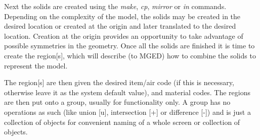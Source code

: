 Next the solids are created using the
{\em make}, {\em cp}, {\em mirror} or {\em in}
commands.  Depending on the complexity of the model, the solids may be
created in the desired location or created at the origin and later
translated to the desired location.  Creation at the origin provides
an opportunity to take advantage of possible symmetries in the geometry.
Once all the solids are finished it is time to create the region[s],
which will describe (to MGED) how to combine the solids to represent
the model.

The region[s] are then given the desired item/air code (if this is
necessary, otherwise leave it as the system default value), and material
codes.  The regions are then put onto a group, usually for functionality only.
A group has no operations as such (like union [u], intersection [+] or
difference [-]) and is just a collection of objects for convenient naming
of a whole screen or collection of objects.
